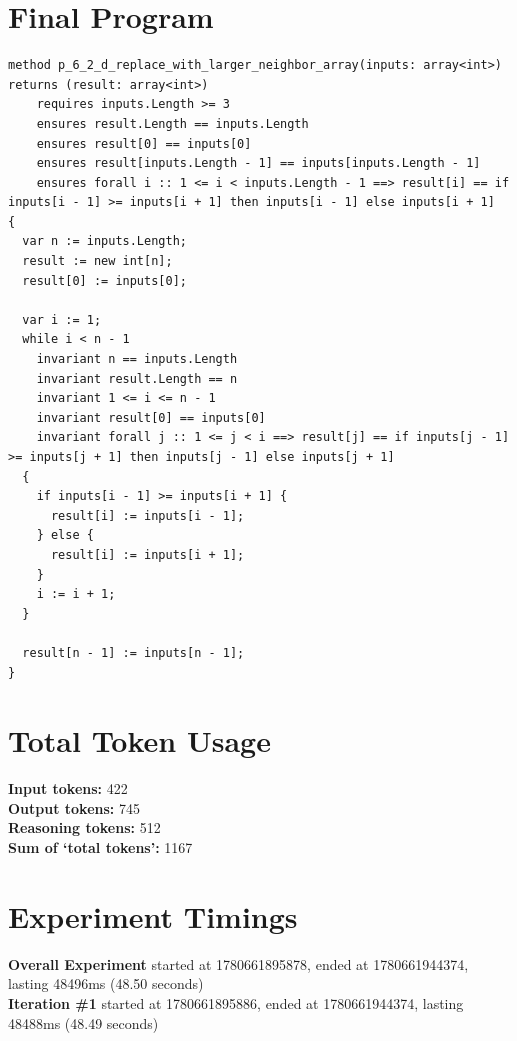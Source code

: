 \documentclass{article}
\begin{document}
\section*{Final Program}
\begin{lstlisting}
method p_6_2_d_replace_with_larger_neighbor_array(inputs: array<int>) returns (result: array<int>)
	requires inputs.Length >= 3
	ensures result.Length == inputs.Length
	ensures result[0] == inputs[0]
	ensures result[inputs.Length - 1] == inputs[inputs.Length - 1]
	ensures forall i :: 1 <= i < inputs.Length - 1 ==> result[i] == if inputs[i - 1] >= inputs[i + 1] then inputs[i - 1] else inputs[i + 1]
{
  var n := inputs.Length;
  result := new int[n];
  result[0] := inputs[0];

  var i := 1;
  while i < n - 1
    invariant n == inputs.Length
    invariant result.Length == n
    invariant 1 <= i <= n - 1
    invariant result[0] == inputs[0]
    invariant forall j :: 1 <= j < i ==> result[j] == if inputs[j - 1] >= inputs[j + 1] then inputs[j - 1] else inputs[j + 1]
  {
    if inputs[i - 1] >= inputs[i + 1] {
      result[i] := inputs[i - 1];
    } else {
      result[i] := inputs[i + 1];
    }
    i := i + 1;
  }

  result[n - 1] := inputs[n - 1];
}
\end{lstlisting}
\section*{Total Token Usage}
\textbf{Input tokens: }422
\\\textbf{Output tokens: }745
\\\textbf{Reasoning tokens: }512
\\\textbf{Sum of `total tokens': }1167
\section*{Experiment Timings}
\textbf{Overall Experiment} started at 1780661895878, ended at 1780661944374, lasting 48496ms (48.50 seconds)
\\\textbf{Iteration \#1} started at 1780661895886, ended at 1780661944374, lasting 48488ms (48.49 seconds)
\end{document}
